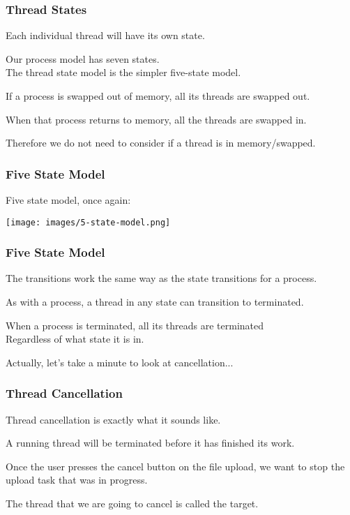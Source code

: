 \begin{frame}
\frametitle{Thread States}
Each individual thread will have its own state. 

Our process model has seven states.\\
\quad The thread state model is the simpler five-state model. 

If a process is swapped out of memory, all its threads are swapped out.

When that process returns to memory, all the threads are swapped in.

Therefore we do not need to consider if a thread is in memory/swapped.

\end{frame}

\begin{frame}
\frametitle{Five State Model}
Five state model, once again:

\begin{center}
\texttt{[image: images/5-state-model.png]}
\end{center}

\end{frame}

\begin{frame}
\frametitle{Five State Model}

The transitions work the same way as the state transitions for a process. 

As with a process, a thread in any state can transition to terminated.

When a process is terminated, all its threads are terminated\\
\quad Regardless of what state it is in.

Actually, let's take a minute to look at cancellation...

\end{frame}

\begin{frame}
\frametitle{Thread Cancellation}

Thread cancellation is exactly what it sounds like. 

A running thread will be terminated before it has finished its work. 

Once the user presses the cancel button on the file upload, we want to stop the upload task that was in progress. 

The thread that we are going to cancel is called the \alert{target}.

\end{frame}

